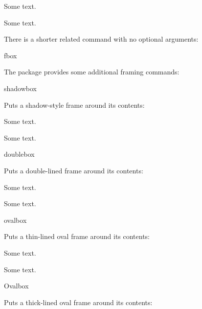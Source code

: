 
\begin{codeS}
Some \oarg{2in} text.
\end{codeS}
\begin{resultS}
Some  text.
\end{resultS}

There is a shorter related command with no optional arguments:
\begin{definition}
\gls{fbox}
\end{definition}

The  package provides some additional framing
commands:
\begin{definition}
\gls{shadowbox}
\end{definition}
Puts a shadow-style frame around its contents:\bookpagebreak
\begin{codeS}
Some  text.
\end{codeS}
\begin{resultS}
Some  text.
\end{resultS}

\begin{definition}
\gls{doublebox}
\end{definition}
Puts a double-lined frame around its contents:
\begin{codeS}
Some  text.
\end{codeS}
\begin{resultS}
Some  text.
\end{resultS}

\begin{definition}
\gls{ovalbox}
\end{definition}
Puts a thin-lined oval frame around its contents:
\begin{codeS}
Some  text.
\end{codeS}
\begin{resultS}
Some  text.
\end{resultS}

\begin{definition}
\gls{Ovalbox}
\end{definition}
Puts a thick-lined oval frame around its contents:

